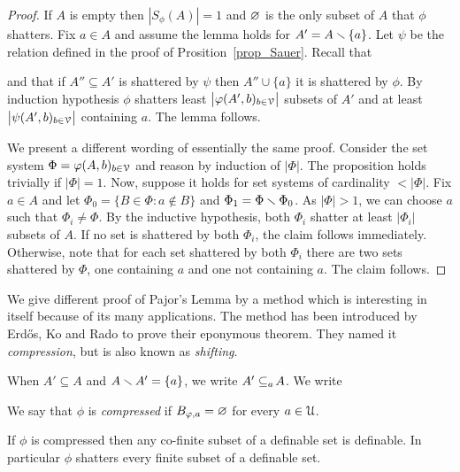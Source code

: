 \documentclass[sputnik.tex]{subfiles}
\begin{document}

\begin{proof}
If $A$ is empty then $|S_\phi(A)|=1$ and $\varnothing$ is the only subset of $A$ that $\phi$ shatters.
Fix $a\in A$ and assume the lemma holds for $A'=A\smallsetminus\{a\}$.
Let $\psi$ be the relation defined in the proof of Prosition~\ref{prop_Sauer}.
Recall that


and that if $A''\subseteq A'$ is shattered by $\psi$ then $A''\cup\{a\}$ it is shattered by $\phi$.
By induction hypothesis $\phi$ shatters least $\big|\varphi(A',b)_{b\in\EuScript V}\big|$ subsets of $A'$ and at least $\big|\psi(A',b)_{b\in\EuScript V}\big|$ containing $a$.
The lemma follows.

We present a different wording of essentially the same proof.
Consider the set system $\Phi=\varphi(A,b)_{b\in\EuScript V}$ and reason by induction of $|\Phi|$.
The proposition holds trivially if $|\Phi|=1$.
Now, suppose it holds for set systems of cardinality $<|\Phi|$.
Fix $a\in A$ and let $\Phi_0=\big\{B\in\Phi : a\notin B\big\}$ and $\Phi_1=\Phi\smallsetminus\Phi_0$.
As $|\Phi|>1$, we can choose $a$ such that $\Phi_i\neq\Phi$.
By the inductive hypothesis, both $\Phi_i$ shatter at least $\big|\Phi_i\big|$ subsets of $A$.
If no set is shattered by both $\Phi_i$, the claim follows immediately.
Otherwise, note that for each set shattered by both $\Phi_i$ there are two sets shattered by $\Phi$, one containing $a$ and one not containing $a$.
The claim follows.
\end{proof}
 
We give different proof of Pajor's Lemma by a method which is interesting in itself because of its many applications.
The method has been introduced by Erd\H{o}s, Ko and Rado to prove their eponymous theorem.
They named it \textit{compression}, but is also known as \textit{shifting}.


When $A'\subseteq A$ and $A\smallsetminus A'=\{a\}$, we write \emph{$A'\subseteq_{a}\kern-1.5pt A$}. We write


We say that $\phi$ is \emph{compressed\/} if $B_{\varphi,a}=\varnothing$ for every $a\in\EuScript U$.

\begin{proposition}\label{prop_compressed} 
If $\phi$ is compressed then any co-finite subset of a definable set is definable.
In particular $\phi$ shatters every finite subset of a definable set.
\end{proposition}
\end{document}
